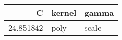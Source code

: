 \begin{tabular}{rll}
\toprule
C & kernel & gamma \\
\midrule
24.851842 & poly & scale \\
\bottomrule
\end{tabular}
